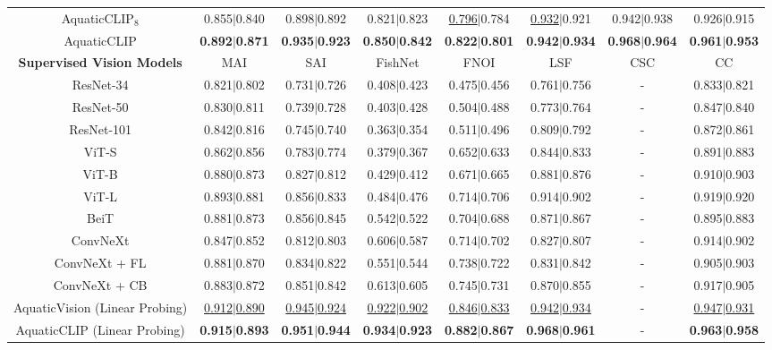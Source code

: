 \begin{table*}[t!]
{{\begin{tabular}{|c|c|c|c|c|c|c|c|}
AquaticCLIP$_{8}$&0.855$|$0.840&0.898$|$0.892&0.821$|$0.823&\underline{0.796}$|$0.784&\underline{0.932}$|$0.921&0.942$|$0.938&0.926$|$0.915\\
AquaticCLIP&\textbf{0.892}$|$\textbf{0.871}&\textbf{0.935}$|$\textbf{0.923}&\textbf{0.850}$|$\textbf{0.842}&\textbf{0.822}$|$\textbf{0.801}&\textbf{0.942}$|$\textbf{0.934}&\textbf{0.968}$|$\textbf{0.964}&\textbf{0.961}$|$\textbf{0.953}\\
\hline 
\textbf{Supervised Vision Models} &MAI \cite{marine_animal}&SAI \cite{sea_animal}&FishNet \cite{khan2023fishnet}&FNOI \cite{kay2021fishnet}&LSF \cite{ulucan2020large}&CSC \cite{coral-species-classification_dataset}&CC \cite{coral_classification} \\
\hline 
ResNet-34 \cite{he2016deep}&0.821$|$0.802&0.731$|$0.726&0.408$|$0.423&0.475$|$0.456&0.761$|$0.756&-&0.833$|$0.821\\
ResNet-50 \cite{he2016deep}&0.830$|$0.811&0.739$|$0.728&0.403$|$0.428&0.504$|$0.488&0.773$|$0.764&-&0.847$|$0.840\\
ResNet-101 \cite{he2016deep}&0.842$|$0.816&0.745$|$0.740&0.363$|$0.354&0.511$|$0.496&0.809$|$0.792&-&0.872$|$0.861\\
ViT-S \cite{alexey2020image}&0.862$|$0.856&0.783$|$0.774&0.379$|$0.367&0.652$|$0.633&0.844$|$0.833&-&0.891$|$0.883\\
ViT-B \cite{alexey2020image}&0.880$|$0.873&0.827$|$0.812&0.429$|$0.412&0.671$|$0.665&0.881$|$0.876&-&0.910$|$0.903\\
ViT-L \cite{alexey2020image}&0.893$|$0.881&0.856$|$0.833&0.484$|$0.476&0.714$|$0.706&0.914$|$0.902&-&0.919$|$0.920\\
BeiT \cite{bao2021beit}&0.881$|$0.873&0.856$|$0.845&0.542$|$0.522&0.704$|$0.688&0.871$|$0.867&-&0.895$|$0.883\\
ConvNeXt \cite{liu2022convnet}&0.847$|$0.852&0.812$|$0.803&0.606$|$0.587&0.714$|$0.702&0.827$|$0.807&-&0.914$|$0.902\\
ConvNeXt \cite{liu2022convnet}+ FL \cite{lin2017focal}&0.881$|$0.870&0.834$|$0.822&0.551$|$0.544&0.738$|$0.722&0.831$|$0.842&-&0.905$|$0.903\\
ConvNeXt \cite{liu2022convnet}+ CB \cite{cui2019class}&0.883$|$0.872&0.851$|$0.842&0.613$|$0.605&0.745$|$0.731&0.870$|$0.855&-&0.917$|$0.905\\
AquaticVision (Linear Probing)&\underline{0.912}$|$\underline{0.890}&\underline{0.945}$|$\underline{0.924}&\underline{0.922}$|$\underline{0.902}&\underline{0.846}$|$\underline{0.833}&\underline{0.942}$|$\underline{0.934}&-&\underline{0.947}$|$\underline{0.931}\\
AquaticCLIP (Linear Probing)&\textbf{0.915}$|$\textbf{0.893}&\textbf{0.951}$|$\textbf{0.944}&\textbf{0.934}$|$\textbf{0.923}&\textbf{0.882}$|$\textbf{0.867}&\textbf{0.968}$|$\textbf{0.961}&-&\textbf{0.963}$|$\textbf{0.958}\\
\hline  
      \end{tabular}
      }}
    \label{table6}
\end{table*}



